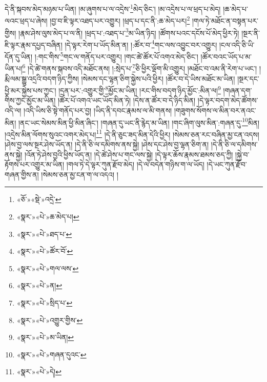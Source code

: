 དེ་ནི་སྐབས་མེད་མཉམ་པ་ཡིན། །མ་ཞུགས་པ་ལ་འདྲེས་\footnote{«ཅོ་»«སྡེ་»འདྲེ་}མེད་ཅིང་། །མ་འདྲེས་པ་ལ་ཕྲད་པ་མེད། །ཆ་མེད་པ་ལའང་ཕྲད་པ་ཞེས། །བྱ་བ་ཇི་ལྟར་འཐད་པར་འགྱུར། །ཕྲད་པ་དང་ནི་:ཆ་མེད་པར།\footnote{«སྣར་»«པེ་»ཆ་མེད་པ།} །གལ་ཏེ་མཐོང་ན་བསྟན་པར་གྱིས། །རྣམ་ཤེས་ལུས་མེད་པ་ལ་ནི། །ཕྲད་པ་:འཐད་པ་\footnote{«སྣར་»«པེ་»ཐད་པ་}མ་ཡིན་ཉིད། །ཚོགས་པའང་དངོས་པོ་མེད་ཕྱིར་ཏེ། །སྔར་ནི་ཇི་ལྟར་རྣམ་དཔྱད་བཞིན། །དེ་ལྟར་རེག་པ་ཡོད་མིན་ན། །:ཚོར་བ་\footnote{«སྣར་»«པེ་»ཚོར་བོ་}གང་ལས་འབྱུང་བར་འགྱུར། །ངལ་འདི་ཅི་ཡི་དོན་དུ་ཡིན། །:གང་གིས་\footnote{«སྣར་»«པེ་»གལ་ལས་}གང་ལ་གནོད་པར་འགྱུར། །གང་ཚེ་ཚོར་པོ་འགའ་མེད་ཅིང་། །ཚོར་བའང་ཡོད་པ་མ་ཡིན་པ།\footnote{«སྣར་»«པེ་»ན།} །དེ་ཚེ་གནས་སྐབས་འདི་མཐོང་ནས། །:སྲེད་པ་\footnote{«སྣར་»«པེ་»སྲིད་པ་}ཅི་ཕྱིར་ལྡོག་མི་འགྱུར། །མཐོང་བ་འམ་ནི་རེག་པ་ཡང་། །རྨི་ལམ་སྒྱུ་འདྲའི་བདག་ཉིད་ཀྱིས། །སེམས་དང་ལྷན་ཅིག་སྐྱེས་པའི་ཕྱིར། །ཚོར་བ་དེ་ཡིས་མཐོང་མ་ཡིན། །སྔར་དང་ཕྱི་མར་སྐྱེས་པས་ཀྱང་། །དྲན་པར་:འགྱུར་གྱི་\footnote{«སྣར་»«པེ་»འགྱུར་གྱིས་}མྱོང་མ་ཡིན། །རང་གིས་བདག་ཉིད་མྱོང་:མིན་ལ།\footnote{«སྣར་»«པེ་»མ་ཡིན།} །གཞན་དག་གིས་ཀྱང་མྱོང་མ་ཡིན། །ཚོར་པོ་འགའ་ཡང་ཡོད་མིན་ཏེ། །དེས་ན་ཚོར་བ་དེ་ཉིད་མིན། །དེ་ལྟར་བདག་མེད་ཚོགས་འདི་ལ། །འདི་ཡིས་ཅི་སྟེ་གནོད་པར་བྱ། །ཡིད་ནི་དབང་རྣམས་ལ་མི་གནས། །གཟུགས་སོགས་ལ་མིན་བར་ནའང་མིན། །ནང་ཡང་སེམས་མིན་ཕྱི་མིན་ཞིང་། །གཞན་དུ་ཡང་ནི་རྙེད་མ་ཡིན། །གང་ཞིག་ལུས་མིན་:གཞན་དུ་\footnote{«སྣར་»«པེ་»གཞན་དུའང་}མིན། །འདྲེས་མིན་ལོགས་སུའང་འགར་མེད་པ།\footnote{«སྣར་»«པེ་»དེ།} །དེ་ནི་ཅུང་ཟད་མིན་དེའི་ཕྱིར། །སེམས་ཅན་རང་བཞིན་མྱ་ངན་འདས། །ཤེས་བྱ་ལས་སྔར་ཤེས་ཡོད་ན། །དེ་ནི་ཅི་ལ་དམིགས་ནས་སྐྱེ། །ཤེས་དང་ཤེས་བྱ་ལྷན་ཅིག་ན། །དེ་ནི་ཅི་ལ་དམིགས་ནས་སྐྱེ། །འོན་ཏེ་ཤེས་བྱའི་ཕྱིས་ཡོད་ན། །དེ་ཚེ་ཤེས་པ་གང་ལས་སྐྱེ། །དེ་ལྟར་ཆོས་རྣམས་ཐམས་ཅད་ཀྱི། །སྐྱེ་བ་རྟོགས་པར་འགྱུར་མ་ཡིན། །གལ་ཏེ་དེ་ལྟར་ཀུན་རྫོབ་མེད། །དེ་ལ་བདེན་གཉིས་ག་ལ་ཡོད། །དེ་ཡང་ཀུན་རྫོབ་གཞན་གྱིས་ན། །སེམས་ཅན་མྱ་ངན་ག་ལ་འདའ། །
